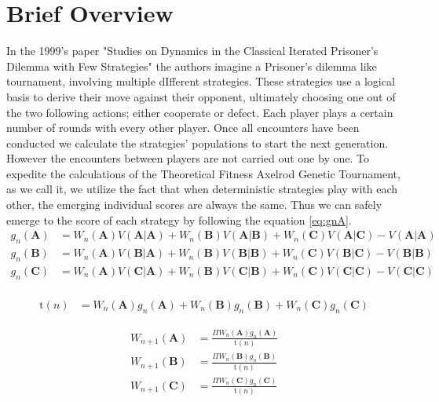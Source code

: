 \documentclass[12pt]{report}
\begin{document}
\section{Brief Overview}
In the 1999's paper "Studies on Dynamics in the Classical Iterated Prisoner’s Dilemma with Few Strategies" the authors imagine a Prisoner's dilemma like tournament, involving multiple dIfferent strategies. These strategies use a logical basis to derive their move against their opponent, ultimately choosing one out of the two following actions; either cooperate or defect. Each player plays a certain number of rounds with every other player. Once all encounters have been conducted we calculate the strategies' populations to start the next generation. However the encounters between players are not carried out one by one. To expedite the calculations of the Theoretical Fitness Axelrod Genetic Tournament, as we call it, we utilize the fact that when deterministic strategies play with each other, the emerging individual scores are always the same. Thus we can safely emerge to the score of each strategy by following the equation \ref{eq:gnA}.
\begin{align}
g_n(\mathbf{A}) &= W_n(\mathbf{A})V(\mathbf{A}|\mathbf{A}) + W_n(\mathbf{B})V(\mathbf{A}|\mathbf{B}) + W_n(\mathbf{C})V(\mathbf{A}|\mathbf{C}) - V(\mathbf{A}|\mathbf{A}) \label{eq:gnA} \\ 
g_n(\mathbf{B}) &= W_n(\mathbf{A})V(\mathbf{B}|\mathbf{A}) + W_n(\mathbf{B})V(\mathbf{B}|\mathbf{B}) + W_n(\mathbf{C})V(\mathbf{B}|\mathbf{C}) - V(\mathbf{B}|\mathbf{B}) \label{eq:gnB} \\
g_n(\mathbf{C}) &= W_n(\mathbf{A})V(\mathbf{C}|\mathbf{A}) + W_n(\mathbf{B})V(\mathbf{C}|\mathbf{B}) + W_n(\mathbf{C})V(\mathbf{C}|\mathbf{C}) - V(\mathbf{C}|\mathbf{C}) \label{eq:gnC} \\
\end{align}

\begin{align}
\mathrm{t}(n) &= W_n(\mathbf{A})g_n(\mathbf{A}) + W_n(\mathbf{B})g_n(\mathbf{B}) + W_n(\mathbf{C})g_n(\mathbf{C})
\end{align}


\begin{align}
W_{n+1}(\mathbf{A}) &= \frac{\Pi W_n(\mathbf{A}) g_n(\mathbf{A})}{\mathrm{t}(n)} \\ \label{eq:fit}
W_{n+1}(\mathbf{B}) &= \frac{\Pi W_n(\mathbf{B}) g_n(\mathbf{B})}{\mathrm{t}(n)} \\
W_{n+1}(\mathbf{C}) &= \frac{\Pi W_n(\mathbf{C}) g_n(\mathbf{C})}{\mathrm{t}(n)}
\end{align}
\end{document}
